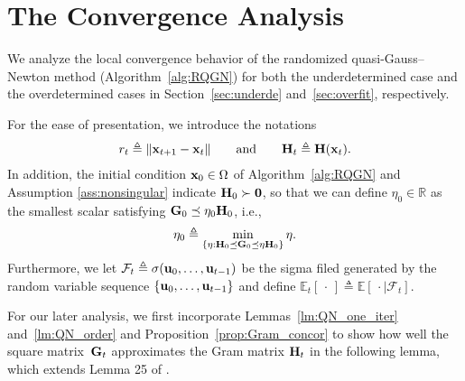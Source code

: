 \documentclass[11pt]{article}
\theoremstyle{plain}
\theoremstyle{definition}
\theoremstyle{remark}
\theoremstyle{plain}
\def\vzero{{\bf{0}}}
\def\vu{{\bf{u}}}
\def\BR{{\mathbb{R}}}
\def\mH {{\bf H}}
\def\BR{{\mathbb{R}}}
\def\G{{\bf G}}
\def\H{{\bf H}}
\def\u{{\bf u}}
\def\x{{\bf x}}
\begin{document}
\section{The Convergence Analysis}\label{sec:local_convergence}

We analyze the local convergence behavior of the randomized quasi-Gauss--Newton method (Algorithm~\ref{alg:RQGN}) for both the underdetermined case and the overdetermined cases in Section~\ref{sec:underde} and~\ref{sec:overfit}, respectively.

For the ease of presentation, we introduce the notations
\begin{align*}
r_t\triangleq \|\x_{t+1}-\x_t\| 
\qquad\text{and}\qquad \H_t\triangleq\H(\x_t).    
\end{align*}
In addition, the initial condition $\x_0\in\Omega$ of Algorithm~\ref{alg:RQGN} and Assumption \ref{ass:nonsingular} indicate $\mH_0\succ \vzero$, so that we can define $\eta_0\in\BR$ as the smallest scalar satisfying $\G_0\preceq\eta_0\H_0$, i.e.,
\begin{align}\label{eq:dfn-eta0}
    \eta_0\triangleq \min_{\{\eta: 
 \H_0\preceq\G_0\preceq \eta\H_0\}}\eta.
\end{align}
Furthermore, we let $\mathcal F_t\triangleq\sigma(\u_0,\ldots,\u_{t-1})$ be the 
sigma filed generated by the random variable sequence $\{\vu_0,\dots,\vu_{t-1}\}$ and define $\mathbb E_t[\,\cdot\,]\triangleq\mathbb E[\,\cdot\mid\mathcal F_t]$.

For our later analysis, we first incorporate Lemmas~\ref{lm:QN_one_iter} and~\ref{lm:QN_order} and Proposition~\ref{prop:Gram_concor} to show how well the square matrix~$\G_{t}$ approximates the Gram matrix $\H_t$ in the following lemma, which extends Lemma 25 of \citet{lin2022explicit}.
\end{document}
